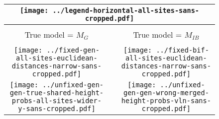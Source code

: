 \documentclass[border=10pt,varwidth=30cm]{standalone}
\newcommand{\genmodel}{\ensuremath{M_{G}}\xspace}
\newcommand{\bimodel}{\ensuremath{M_{IB}}\xspace}
\begin{document}
\begin{figure}
    \setlength\arrayrulewidth{2pt}
    \centering
    \begin{tabular}{@{}ccc@{}}
        \hline
        \multicolumn{3}{|c|}{\texttt{[image: ../legend-horizontal-all-sites-sans-cropped.pdf]}} \\
        \hline
        & & \\
        {\Huge True model = \genmodel}
        &
        &
        {\Huge True model = \bimodel}
        \\[2ex]
        \cline{1-1}\cline{3-3}
        & & \\
        \texttt{[image: ../fixed-gen-all-sites-euclidean-distances-narrow-sans-cropped.pdf]}
        &
        &
        \texttt{[image: ../fixed-bif-all-sites-euclidean-distances-narrow-sans-cropped.pdf]}
        \\
        \texttt{[image: ../unfixed-gen-gen-true-shared-height-probs-all-sites-wider-y-sans-cropped.pdf]}
        &
        &
        \texttt{[image: ../unfixed-gen-gen-wrong-merged-height-probs-vln-sans-cropped.pdf]}
        \\
    \end{tabular}
\end{figure}
\end{document}
